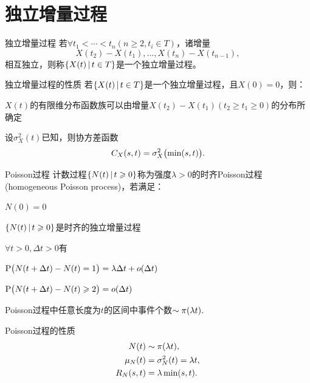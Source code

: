 \section{独立增量过程}
\begin{definition}{独立增量过程}{}
	若$\forall t_1 < \cdots < t_n(n \geqslant 2, t_i \in T)$，诸增量
	\[
		X(t_2) - X(t_1),\ldots,X(t_n) - X(t_{n-1}),
	\]
	相互独立，则称$\{X(t)\,\vert\,t \in T\}$是一个独立增量过程。
\end{definition}
\begin{theorem}{独立增量过程的性质}{}
	若$\{X(t)\,\vert\,t \in T\}$是一个独立增量过程，且$X(0) = 0$，则：
	\begin{compactitem}
		\item $X(t)$的有限维分布函数族可以由增量$X(t_2) - X(t_1)(t_2 \geqslant t_1 \geqslant 0)$的分布所确定
		\item 设$\sigma^2_X(t)$已知，则协方差函数
		\begin{equation}
			C_X(s,t) = \sigma^2_X\bigl(\min(s,t)\bigr).
		\end{equation}
	\end{compactitem}
\end{theorem}
\begin{definition}{Poisson过程}{}
	计数过程$\{N(t)\,\vert\,t \geqslant 0\}$称为强度$\lambda > 0$的时齐Poisson过程(homogeneous Poisson process)，若满足：
	\begin{compactenum}
		\item $N(0) = 0$
		\item $\{N(t)\,\vert\,t \geqslant 0\}$是时齐的独立增量过程
		\item $\forall t > 0,\Delta t > 0$有
		\begin{compactitem}
			\item $\operatorname{P}\bigl(N(t + \Delta t) - N(t) = 1\bigr) = \lambda\Delta t + o(\Delta t)$
			\item $\operatorname{P}\bigl(N(t + \Delta t) - N(t) \geqslant 2\bigr) = o(\Delta t)$
		\end{compactitem}
	\end{compactenum}
\end{definition}
Poisson过程中任意长度为$ t $的区间中事件个数$\sim \operatorname{\pi}(\lambda t).$
\begin{theorem}{Poisson过程的性质}{}
	\begin{equation}\label{eq:ps-poisson-process-moments}
	    \begin{aligned}
			N(t) &\sim \operatorname{\pi}(\lambda t),\\
			\mu_N(t) &= \sigma^2_N(t) = \lambda t,\\
			R_N(s,t) &= \lambda\min(s,t).
	    \end{aligned}
	\end{equation}
\end{theorem}

